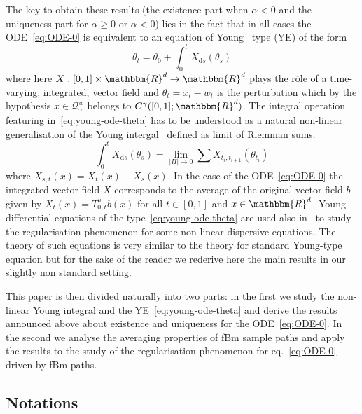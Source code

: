 \documentclass[a4paper,11pt]{article}
\newcommand{\mathd}{\mathrm{d}}
\newcommand{\CQ}{\mathscr Q}
\begin{document}
The key to obtain these results (the existence part when $\alpha <0$ and the
uniqueness part for $\alpha \geqslant 0$ or $\alpha <0$) lies in the fact that
in all cases the ODE~{\eqref{eq:ODE-0}} is equivalent to an equation of Young
\ type (YE) of the form
\begin{equation}
  \theta_{t} = \theta_{0} + \int_{0}^{t} X_{\mathd s} ( \theta_{s} )
  \label{eq:young-ode-theta}
\end{equation}
where here $X: [ 0,1 ] \times \mathbbm{R}^{d} \rightarrow \mathbbm{R}^{d}$
plays the r\"ole of a time-varying, integrated, vector field and $\theta_{t}
=x_{t} -w_{t}$ is the perturbation which by the hypothesis $x \in
\CQ^{w}_{\gamma}$ belongs to $C^{\gamma} ( [ 0,1 ] ;\mathbbm{R}^{d}
)$. The integral operation featuring in~{\eqref{eq:young-ode-theta}} has to be
understood as a natural non-linear generalisation of the Young
intergal~{\cite{Young}} defined as limit of Riemman sums:
\[ \int_{0}^{t} X_{\mathd s} ( \theta_{s} ) = \lim_{| \Pi | \rightarrow 0}
   \sum X_{t_{i} ,t_{i+1}} ( \theta_{t_{i}} ) \]
where $X_{s,t} ( x ) =X_{t} ( x ) -X_{s} ( x )$. In the case of the
ODE~{\eqref{eq:ODE-0}} the integrated vector field $X$ corresponds to the
average of the original vector field $b$ given by $X_{t} ( x ) =T_{0,t}^{w} b
( x )$ for all $t \in [ 0,1 ]$ and $x \in \mathbbm{R}^{d}$. Young differential
equations of the type~{\eqref{eq:young-ode-theta}} are used also
in~{\cite{random-modulation-1,random-modulation-2}} to study the regularisation phenomenon for some
non-linear dispersive equations. The theory of such equations is very similar
to the theory for standard Young-type equation but for the sake of the reader
we rederive here the main results in our slightly non standard setting.



This paper is then divided naturally into two parts: in the first we study the
non-linear Young integral and the YE~{\eqref{eq:young-ode-theta}} and derive
the results announced above about existence and uniqueness for the
ODE~{\eqref{eq:ODE-0}}. In the second we analyse the averaging properties of
fBm sample paths and apply the results to the study of the regularisation
phenomenon for eq.~{\eqref{eq:ODE-0}} driven by fBm paths.

\subsection{Notations}
\end{document}
